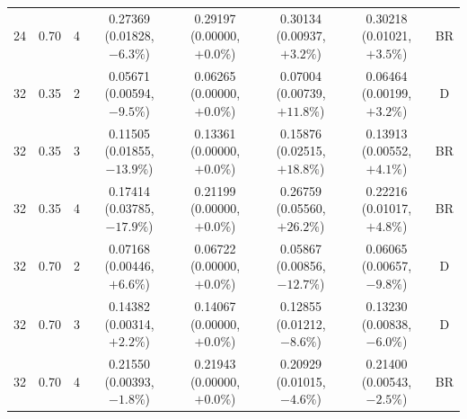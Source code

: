 \begin{longtable}{rrrccccc}
24 & 0.70 & 4 & \shortstack{0.27369\\(0.01828, $-6.3\%$)} & \shortstack{0.29197\\(0.00000, $+0.0\%$)} & \shortstack{0.30134\\(0.00937, $+3.2\%$)} & \shortstack{0.30218\\(0.01021, $+3.5\%$)} & BR \\
32 & 0.35 & 2 & \shortstack{0.05671\\(0.00594, $-9.5\%$)} & \shortstack{0.06265\\(0.00000, $+0.0\%$)} & \shortstack{0.07004\\(0.00739, $+11.8\%$)} & \shortstack{0.06464\\(0.00199, $+3.2\%$)} & D \\
32 & 0.35 & 3 & \shortstack{0.11505\\(0.01855, $-13.9\%$)} & \shortstack{0.13361\\(0.00000, $+0.0\%$)} & \shortstack{0.15876\\(0.02515, $+18.8\%$)} & \shortstack{0.13913\\(0.00552, $+4.1\%$)} & BR \\
32 & 0.35 & 4 & \shortstack{0.17414\\(0.03785, $-17.9\%$)} & \shortstack{0.21199\\(0.00000, $+0.0\%$)} & \shortstack{0.26759\\(0.05560, $+26.2\%$)} & \shortstack{0.22216\\(0.01017, $+4.8\%$)} & BR \\
32 & 0.70 & 2 & \shortstack{0.07168\\(0.00446, $+6.6\%$)} & \shortstack{0.06722\\(0.00000, $+0.0\%$)} & \shortstack{0.05867\\(0.00856, $-12.7\%$)} & \shortstack{0.06065\\(0.00657, $-9.8\%$)} & D \\
32 & 0.70 & 3 & \shortstack{0.14382\\(0.00314, $+2.2\%$)} & \shortstack{0.14067\\(0.00000, $+0.0\%$)} & \shortstack{0.12855\\(0.01212, $-8.6\%$)} & \shortstack{0.13230\\(0.00838, $-6.0\%$)} & D \\
32 & 0.70 & 4 & \shortstack{0.21550\\(0.00393, $-1.8\%$)} & \shortstack{0.21943\\(0.00000, $+0.0\%$)} & \shortstack{0.20929\\(0.01015, $-4.6\%$)} & \shortstack{0.21400\\(0.00543, $-2.5\%$)} & BR \\

\end{longtable}
